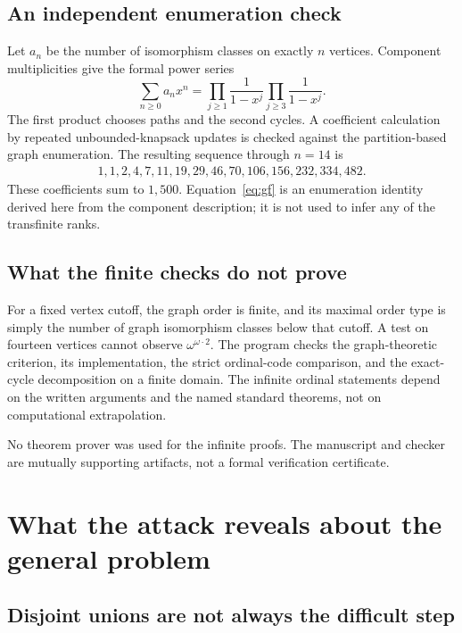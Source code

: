 \documentclass[11pt,letterpaper]{article}
\theoremstyle{plain}
\theoremstyle{definition}
\theoremstyle{remark}
\begin{document}
\subsection{An independent enumeration check}

Let $a_n$ be the number of isomorphism classes on exactly $n$ vertices.
Component multiplicities give the formal power series
\begin{equation}\label{eq:gf}
 \sum_{n\ge0}a_nx^n
 =\prod_{j\ge1}\frac{1}{1-x^j}
  \prod_{j\ge3}\frac{1}{1-x^j}.
\end{equation}
The first product chooses paths and the second cycles. A coefficient
calculation by repeated unbounded-knapsack updates is checked against
the partition-based graph enumeration. The resulting sequence through
$n=14$ is
\[
\begin{gathered}
1,1,2,4,7,11,19,29,46,70,106,156,232,334,482.
\end{gathered}
\]
These coefficients sum to $1{,}500$. Equation~\eqref{eq:gf} is an
enumeration identity derived here from the component description;
it is not used to infer any of the transfinite ranks.

\subsection{What the finite checks do not prove}

For a fixed vertex cutoff, the graph order is finite, and its maximal
order type is simply the number of graph isomorphism classes below
that cutoff. A test on fourteen vertices cannot observe
$\omega^{\omega\cdot2}$. The program checks the graph-theoretic
criterion, its implementation, the strict ordinal-code comparison,
and the exact-cycle decomposition on a finite domain. The infinite
ordinal statements depend on the written arguments and the named
standard theorems, not on computational extrapolation.

No theorem prover was used for the infinite proofs. The manuscript
and checker are mutually supporting artifacts, not a formal
verification certificate.

\section{What the attack reveals about the general problem}\label{sec:outlook}

\subsection{Disjoint unions are not always the difficult step}
\end{document}
